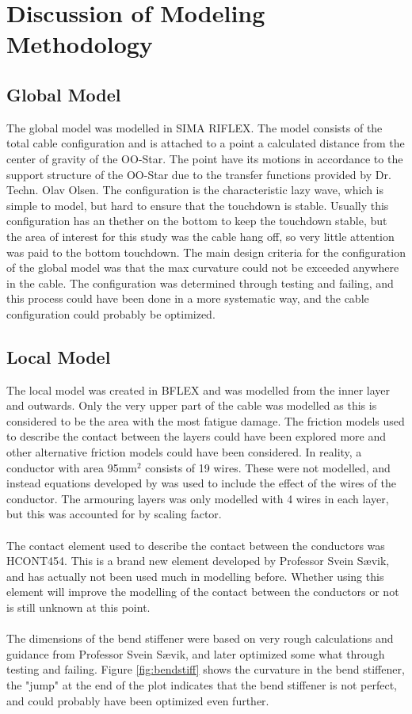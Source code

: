 \section{Discussion of Modeling Methodology}
\subsection{Global Model}
 The global model was modelled in SIMA RIFLEX. The model consists of the total cable configuration and is attached to a point a calculated distance from the center of gravity of the OO-Star. The point have its motions in accordance to the support structure of the OO-Star due to the transfer functions provided by Dr. Techn. Olav Olsen. The configuration is the characteristic lazy wave, which is simple to model, but hard to ensure that the touchdown is stable. Usually this configuration has an thether on the bottom to keep the touchdown stable, but the area of interest for this study was the cable hang off, so very little attention was paid to the bottom touchdown. The main design criteria for the configuration of the global model was that the max curvature could not be exceeded anywhere in the cable. The configuration was determined through testing and failing, and this process could have been done in a more systematic way, and the cable configuration could probably be optimized.
\subsection{Local Model}
The local model was created in BFLEX and was modelled from the inner layer and outwards. Only the very upper part of the cable was modelled as this is considered to be the area with the most fatigue damage. The friction models used to describe the contact between the layers could have been explored more and other alternative friction models could have been considered. In reality, a conductor with area 95mm$^2$ consists of 19 wires. These were not modelled, and instead equations developed by \cite{s300} was used to include the effect of the wires of the conductor. The armouring layers was only modelled with 4 wires in each layer, but this was accounted for by scaling factor. \\\\ The contact element used to describe the contact between the conductors was HCONT454. This is a brand new element developed by Professor Svein Sævik, and has actually not been used much in modelling before. Whether using this element will improve the modelling of the contact between the conductors or not is still unknown at this point. \\\\The dimensions of the bend stiffener were based on very rough calculations and guidance from Professor Svein Sævik, and later optimized some what through testing and failing. Figure \ref{fig:bendstiff} shows the curvature in the bend stiffener, the "jump" at the end of the plot indicates that the bend stiffener is not perfect, and could probably have been optimized even further. 
